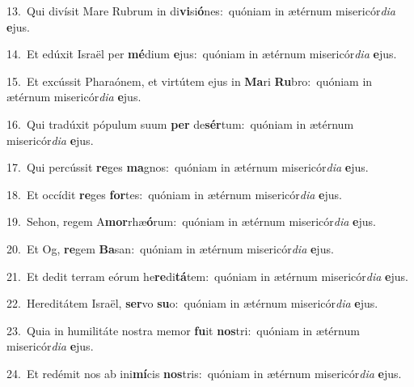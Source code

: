 {\numbfont\textcolor{\numbcolor}{13.}}~Qui divísit Mare Rubrum in di\-\textbf{vi}\-si\-\textbf{ó}\-nes:~\star quóniam in ætérnum misericór\-\textit{di}\-\textit{a} \textbf{e}\-jus.\par
{\numbfont\textcolor{\numbcolor}{14.}}~Et edúxit Israël per \textbf{mé}\-dium \textbf{e}\-jus:~\star quóniam in ætérnum misericór\-\textit{di}\-\textit{a} \textbf{e}\-jus.\par
{\numbfont\textcolor{\numbcolor}{15.}}~Et excússit Pharaónem, et virtútem ejus in \textbf{Ma}\-ri \textbf{Ru}\-bro:~\star quóniam in ætérnum misericór\-\textit{di}\-\textit{a} \textbf{e}\-jus.\par
{\numbfont\textcolor{\numbcolor}{16.}}~Qui tradúxit pópulum suum \textbf{per} de\-\textbf{sér}\-tum:~\star quóniam in ætérnum misericór\-\textit{di}\-\textit{a} \textbf{e}\-jus.\par
{\numbfont\textcolor{\numbcolor}{17.}}~Qui percússit \textbf{re}\-ges \textbf{ma}\-gnos:~\star quóniam in ætérnum misericór\-\textit{di}\-\textit{a} \textbf{e}\-jus.\par
{\numbfont\textcolor{\numbcolor}{18.}}~Et occídit \textbf{re}\-ges \textbf{for}\-tes:~\star quóniam in ætérnum misericór\-\textit{di}\-\textit{a} \textbf{e}\-jus.\par
{\numbfont\textcolor{\numbcolor}{19.}}~Sehon, regem A\-\textbf{mor}\-rhæ\-\textbf{ó}\-rum:~\star quóniam in ætérnum misericór\-\textit{di}\-\textit{a} \textbf{e}\-jus.\par
{\numbfont\textcolor{\numbcolor}{20.}}~Et Og, \textbf{re}\-gem \textbf{Ba}\-san:~\star quóniam in ætérnum misericór\-\textit{di}\-\textit{a} \textbf{e}\-jus.\par
{\numbfont\textcolor{\numbcolor}{21.}}~Et dedit terram eórum he\-\textbf{re}\-di\-\textbf{tá}\-tem:~\star quóniam in ætérnum misericór\-\textit{di}\-\textit{a} \textbf{e}\-jus.\par
{\numbfont\textcolor{\numbcolor}{22.}}~Hereditátem Israël, \textbf{ser}\-vo \textbf{su}\-o:~\star quóniam in ætérnum misericór\-\textit{di}\-\textit{a} \textbf{e}\-jus.\par
{\numbfont\textcolor{\numbcolor}{23.}}~Quia in humilitáte nostra memor \textbf{fu}\-it \textbf{nos}\-tri:~\star quóniam in ætérnum misericór\-\textit{di}\-\textit{a} \textbf{e}\-jus.\par
{\numbfont\textcolor{\numbcolor}{24.}}~Et redémit nos ab ini\-\textbf{mí}\-cis \textbf{nos}\-tris:~\star quóniam in ætérnum misericór\-\textit{di}\-\textit{a} \textbf{e}\-jus.\par
